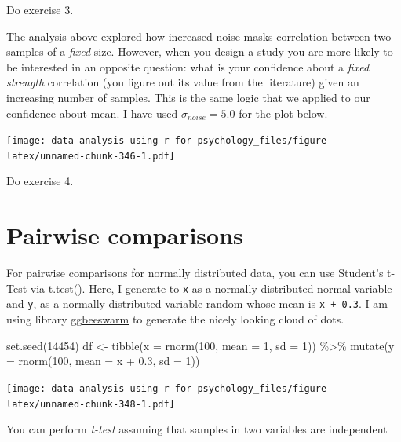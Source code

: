 \documentclass[
]{book}
\newenvironment{Shaded}{\begin{snugshade}}{\end{snugshade}}
\newcommand{\AttributeTok}[1]{\textcolor[rgb]{0.77,0.63,0.00}{#1}}
\newcommand{\DecValTok}[1]{\textcolor[rgb]{0.00,0.00,0.81}{#1}}
\newcommand{\FloatTok}[1]{\textcolor[rgb]{0.00,0.00,0.81}{#1}}
\newcommand{\FunctionTok}[1]{\textcolor[rgb]{0.00,0.00,0.00}{#1}}
\newcommand{\NormalTok}[1]{#1}
\newcommand{\OtherTok}[1]{\textcolor[rgb]{0.56,0.35,0.01}{#1}}
\newcommand{\SpecialCharTok}[1]{\textcolor[rgb]{0.00,0.00,0.00}{#1}}
\begin{document}
Do exercise 3.

The analysis above explored how increased noise masks correlation between two samples of a \emph{fixed} size. However, when you design a study you are more likely to be interested in an opposite question: what is your confidence about a \emph{fixed strength} correlation (you figure out its value from the literature) given an increasing number of samples. This is the same logic that we applied to our confidence about mean. I have used \(\sigma_{noise} = 5.0\) for the plot below.

\texttt{[image: data-analysis-using-r-for-psychology\_files/figure-latex/unnamed-chunk-346-1.pdf]}

Do exercise 4.

\hypertarget{pairwise-comparisons}{%
\section{Pairwise comparisons}\label{pairwise-comparisons}}

For pairwise comparisons for normally distributed data, you can use Student's t-Test via \href{https://stat.ethz.ch/R-manual/R-devel/library/stats/html/t.test.html}{t.test()}. Here, I generate to \texttt{x} as a normally distributed normal variable and \texttt{y}, as a normally distributed variable random whose mean is \texttt{x\ +\ 0.3}. I am using library \href{https://github.com/eclarke/ggbeeswarm}{ggbeeswarm} to generate the nicely looking cloud of dots.

\begin{Shaded}
\begin{Highlighting}[]
\FunctionTok{set.seed}\NormalTok{(}\DecValTok{14454}\NormalTok{)}
\NormalTok{df }\OtherTok{\textless{}{-}} 
  \FunctionTok{tibble}\NormalTok{(}\AttributeTok{x =} \FunctionTok{rnorm}\NormalTok{(}\DecValTok{100}\NormalTok{, }\AttributeTok{mean =} \DecValTok{1}\NormalTok{, }\AttributeTok{sd =} \DecValTok{1}\NormalTok{)) }\SpecialCharTok{\%\textgreater{}\%}
  \FunctionTok{mutate}\NormalTok{(}\AttributeTok{y =} \FunctionTok{rnorm}\NormalTok{(}\DecValTok{100}\NormalTok{, }\AttributeTok{mean =}\NormalTok{ x }\SpecialCharTok{+} \FloatTok{0.3}\NormalTok{, }\AttributeTok{sd =} \DecValTok{1}\NormalTok{))}
\end{Highlighting}
\end{Shaded}

\texttt{[image: data-analysis-using-r-for-psychology\_files/figure-latex/unnamed-chunk-348-1.pdf]}

You can perform \emph{t-test} assuming that samples in two variables are independent
\end{document}
